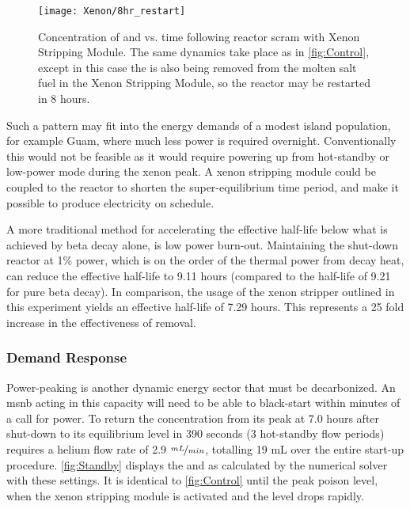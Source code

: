 \begin{figure}[b!]
    \centering
    \texttt{[image: Xenon/8hr\_restart]}
    \caption[Concentration of \I and \Xe vs. time following reactor scram - Restart Mode]{Concentration of \I and \Xe vs. time following reactor scram with Xenon Stripping Module. The same dynamics take place as in \cref{fig:Control}, except in this case the \Xe is also being removed from the molten salt fuel in the Xenon Stripping Module, so the reactor may be restarted in 8 hours.}
    \label{fig:Restart}
\end{figure}

Such a pattern may fit into the energy demands of a modest island population, for example Guam, where much less power is required overnight. Conventionally this would not be feasible as it would require powering up from hot-standby or low-power mode during the xenon peak. A xenon stripping module could be coupled to the reactor to shorten the super-equilibrium time period, and make it possible to produce electricity on schedule.

A more traditional method for accelerating the effective half-life below what is achieved by beta decay alone, is low power burn-out. Maintaining the shut-down reactor at 1\% power, which is on the order of the thermal power from decay heat, can reduce the effective half-life to 9.11 hours (compared to the half-life of 9.21 for pure beta decay). In comparison, the usage of the xenon stripper outlined in this experiment yields an effective half-life of 7.29 hours. This represents a 25 fold increase in the effectiveness of \Xe removal.

\subsubsection{Demand Response}
Power-peaking is another dynamic energy sector that must be decarbonized. An \acs{msnb} acting in this capacity will need to be able to black-start within minutes of a call for power. To return the \Xe concentration from its peak at 7.0 hours after shut-down to its equilibrium level in 390 seconds (3 hot-standby flow periods) requires a helium flow rate of 2.9 $\nicefrac{mL}{min}$, totalling 19 mL over the entire start-up procedure. \cref{fig:Standby} displays the \I and \Xe as calculated by the numerical solver with these settings. It is identical to \cref{fig:Control} until the peak poison level, when the xenon stripping module is activated and the \Xe level drops rapidly. 

